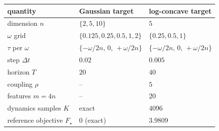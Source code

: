 \begin{tabular}{lll}
\toprule
quantity & Gaussian target & log-concave target \\
\midrule
dimension $n$ & $\{2,5,10\}$ & $5$ \\
$\omega$ grid & $\{0.125,0.25,0.5,1,2\}$ & $\{0.25,0.5,1\}$ \\
$\tau$ per $\omega$ & $\{-\omega/2n,\,0,\,+\omega/2n\}$ & $\{-\omega/2n,\,0,\,+\omega/2n\}$ \\
step $\Delta t$ & $0.02$ & $0.005$ \\
horizon $T$ & $20$ & $40$ \\
coupling $\rho$ & -- & $5$ \\
features $m=4n$ & -- & $20$ \\
dynamics samples $K$ & exact & $4096$ \\
reference objective $F_\star$ & $0$ (exact) & $3.9809$ \\
\bottomrule
\end{tabular}
